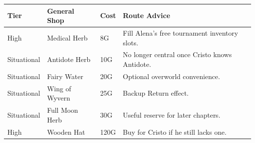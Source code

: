\documentclass[
  american,
  10pt,
  letterpaper,
  oneside,
  open=any]{scrreprt}
\newcounter{none} %
\newenvironment{guidetable}{%
  \small\setstretch{1.0}%
  \setlength{\tabcolsep}{4pt}%
  \setlength{\LTpre}{8pt}\setlength{\LTpost}{10pt}%
  \renewcommand{\arraystretch}{1.16}%
}{ }
\begin{document}
\begin{guidetable}

{\def\LTcaptype{none} %
\begin{longtable}[]{@{}
  >{\raggedright\arraybackslash}p{}
  >{\raggedright\arraybackslash}p{}
  >{\raggedleft\arraybackslash}p{}
  >{\raggedright\arraybackslash}p{}@{}}
\toprule\noalign{}
\begin{minipage}[b]{\linewidth}\raggedright
\color{GuideGreen}\bfseries Tier
\end{minipage} & \begin{minipage}[b]{\linewidth}\raggedright
\color{GuideGreen}\bfseries General Shop
\end{minipage} & \begin{minipage}[b]{\linewidth}\raggedleft
\color{GuideGreen}\bfseries Cost
\end{minipage} & \begin{minipage}[b]{\linewidth}\raggedright
\color{GuideGreen}\bfseries Route Advice
\end{minipage} \\
\midrule\noalign{}
\endhead
\bottomrule\noalign{}
\endlastfoot
High & Medical Herb & 8G & Fill Alena's free tournament inventory
slots. \\
Situational & Antidote Herb & 10G & No longer central once Cristo knows
Antidote. \\
Situational & Fairy Water & 20G & Optional overworld convenience. \\
Situational & Wing of Wyvern & 25G & Backup Return effect. \\
Situational & Full Moon Herb & 30G & Useful reserve for later
chapters. \\
High & Wooden Hat & 120G & Buy for Cristo if he still lacks one. \\
\end{longtable}
}

\end{guidetable}
\end{document}
